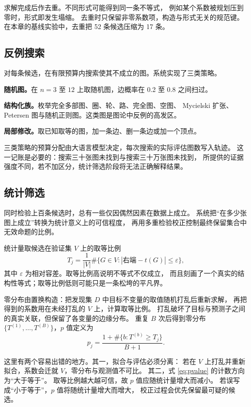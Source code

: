 求解完成后作去重。不同形式可能得到同一条不等式，
例如某个系数被规划压到零时，形式即发生塌缩。
去重时只保留非零系数项，构造与形式无关的规范键。
在本章的基线实验中，去重把 52 条候选压缩为 17 条。

\subsection{反例搜索}

对每条候选，在有限预算内搜索使其不成立的图。系统实现了三类策略。

\textbf{随机图。}在 $n=3$ 至 $12$ 上取随机图，边概率在 0.2 至 0.8 之间扫过。

\textbf{结构化族。}枚举完全多部图、圈、轮、路、完全图、空图、
Mycielski 扩张、Petersen 图与随机正则图。这类图是图论中反例的高发区。

\textbf{局部修改。}取已知取等的图，加一条边、删一条边或加一个顶点。

三类策略的预算分配由大语言模型决定，每次搜索的实际评估图数写入轨迹。
这一记账是必要的：搜索三十张图未找到与搜索三十万张图未找到，
所提供的证据强度不同，若不加区分，统计筛选阶段将无法正确解释结果。

\subsection{统计筛选}

同时检验上百条候选时，总有一些仅因偶然因素在数据上成立。
系统把“在多少张图上成立”转换为统计意义上的可信程度，
再用多重检验校正控制最终保留集合中无效命题的比例。

统计量取候选在验证集 $V$ 上的取等比例
\begin{equation}
  T_j = \frac{1}{|V|}\#\bigl\{G \in V : |\text{右端} - t(G)| \leq \varepsilon\bigr\},
\end{equation}
其中 $\varepsilon$ 为相对容差。取等比例高说明不等式不仅成立，
而且刻画了一个真实的结构性等式；取等比例低则可能只是一条松垮的平凡界。

零分布由置换构造：把发现集 $D$ 中目标不变量的取值随机打乱后重新求解，
再把得到的系数用在未经打乱的 $V$ 上，计算取等比例。
打乱破坏了目标与预测子之间的真实关联，但保留了各变量的边缘分布。
重复 $B$ 次后得到零分布 $\{T^{(1)},\dots,T^{(B)}\}$，$p$ 值定义为
\begin{equation}
  p_j = \frac{1 + \#\{b : T^{(b)} \geq T_j\}}{B + 1}.
  \label{eq:pvalue}
\end{equation}

这里有两个容易出错的地方。其一，拟合与评估必须分离：
若在 $V$ 上打乱并重新拟合，系数会迁就 $V$，零分布与观测值不可比。
其二，式 \eqref{eq:pvalue} 的计数方向为“大于等于”。
取等比例越大越可信，故 $p$ 值应随统计量增大而减小。
若误写成“小于等于”，$p$ 值将随统计量增大而增大，
校正过程会优先保留最可疑的候选。

